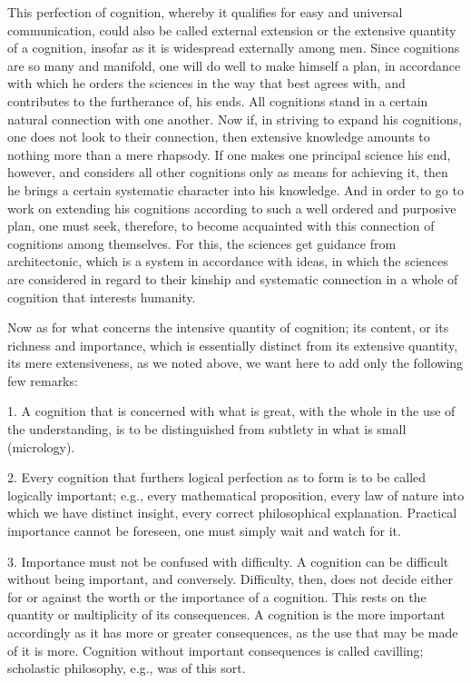 This perfection of cognition, whereby it qualifies for easy and universal
communication, could also be called external extension or the extensive
quantity of a cognition, insofar as it is widespread externally among men.
Since cognitions are so many and manifold, one will do well to make
himself a plan, in accordance with which he orders the sciences in the way
that best agrees with, and contributes to the furtherance of, his ends. All
cognitions stand in a certain natural connection with one another. Now if,
in striving to expand his cognitions, one does not look to their connection,
then extensive knowledge amounts to nothing more than a mere rhapsody.
If one makes one principal science his end, however, and
considers all other cognitions only as means for achieving it,
then he brings a certain systematic character into his knowledge.
And in order to go to work on extending his cognitions
according to such a well ordered and purposive plan,
one must seek, therefore, to become acquainted with
this connection of cognitions among themselves.
For this, the sciences get guidance from architectonic,
which is a system in accordance with ideas,
in which the sciences are considered in regard to their kinship and
systematic connection in a whole of cognition that interests humanity.

Now as for what concerns the intensive quantity of cognition;
its content, or its richness and importance,
which is essentially distinct from its extensive quantity,
its mere extensiveness, as we noted above,
we want here to add only the following few remarks:

1. A cognition that is concerned with what is great,
with the whole in the use of the understanding,
is to be distinguished from subtlety in what is small (micrology).

2. Every cognition that furthers logical perfection
as to form is to be called logically important;
e.g., every mathematical proposition, every law of nature
into which we have distinct insight, every correct philosophical explanation.
Practical importance cannot be foreseen, one must simply wait and watch for it.

3. Importance must not be confused with difficulty.
A cognition can be difficult without being important, and conversely.
Difficulty, then, does not decide either for or against
the worth or the importance of a cognition.
This rests on the quantity or multiplicity of its consequences.
A cognition is the more important accordingly as
it has more or greater consequences, as the use that
may be made of it is more.
Cognition without important consequences is called cavilling;
scholastic philosophy, e.g., was of this sort.

